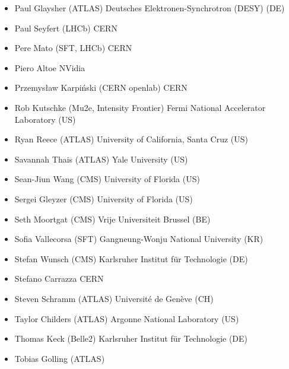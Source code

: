 \begin{itemize}
 \item Paul Glaysher (ATLAS)
       \newline Deutsches Elektronen-Synchrotron (DESY) (DE)
 \item Paul Seyfert (LHCb)
       \newline CERN
 \item Pere Mato (SFT, LHCb)
       \newline CERN
 \item Piero Altoe
       \newline NVidia
 \item Przemysław Karpiński (CERN openlab)
       \newline CERN
 \item Rob Kutschke (Mu2e, Intensity Frontier)
       \newline Fermi National Accelerator Laboratory (US)
 \item Ryan Reece (ATLAS)
       \newline University of California, Santa Cruz (US)
 \item Savannah Thais (ATLAS)
       \newline Yale University (US)
 \item Sean-Jiun Wang (CMS)
       \newline University of Florida (US)
 \item Sergei Gleyzer (CMS)
       \newline University of Florida (US)
 \item Seth Moortgat (CMS)
       \newline Vrije Universiteit Brussel (BE)
 \item Sofia Vallecorsa (SFT)
       \newline Gangneung-Wonju National University (KR)
 \item Stefan Wunsch (CMS)
       \newline Karlsruher Institut f{\"u}r Technologie (DE)
 \item Stefano Carrazza
       \newline CERN
 \item Steven Schramm (ATLAS)
       \newline Universit{\'e} de Gen{\`e}ve (CH)
 \item Taylor Childers (ATLAS)
       \newline Argonne National Laboratory (US)
 \item Thomas Keck (Belle2)
       \newline Karlsruher Institut f{\"u}r Technologie (DE)
 \item Tobias Golling (ATLAS)

\end{itemize}

